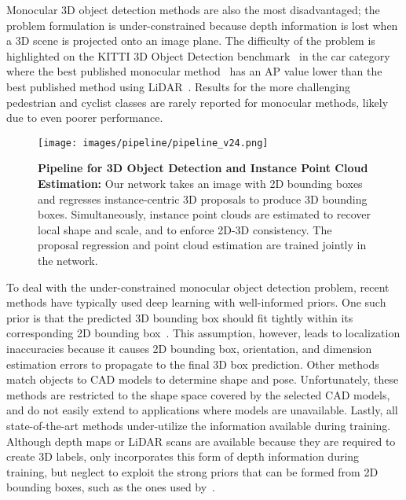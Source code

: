 \documentclass[10pt,twocolumn,letterpaper]{article}
\begin{document}
	Monocular 3D object detection methods are also the most disadvantaged; the problem formulation is under-constrained because depth information is lost when a 3D scene is projected onto an image plane. The difficulty of the problem is highlighted on the KITTI 3D Object Detection benchmark~\cite{geiger_kitti} in the car category where the best published monocular method~\cite{lindernoren} has an AP value  lower than the best published method using LiDAR~\cite{yan2018second}. Results for the more challenging pedestrian and cyclist classes are rarely reported for monocular methods, likely due to even poorer performance.
	
	\begin{figure}[t!]
		\begin{center}
			\texttt{[image: images/pipeline/pipeline\_v24.png]}
		\end{center}
		\caption{\textbf{Pipeline for 3D Object Detection and Instance Point Cloud Estimation:} Our network takes an image with 2D bounding boxes and regresses instance-centric 3D proposals to produce 3D bounding boxes. Simultaneously, instance point clouds are estimated to recover local shape and scale, and to enforce 2D-3D consistency. The proposal regression and point cloud estimation are trained jointly in the network.}
		\label{fig:pipeline}
	\end{figure}
	
	To deal with the under-constrained monocular object detection problem, recent methods have typically used deep learning with well-informed priors. One such prior is that the predicted 3D bounding box should fit tightly within its corresponding 2D bounding box~\cite{mousavian_deep3dbox}. This assumption, however, leads to localization inaccuracies because it causes 2D bounding box, orientation, and dimension estimation errors to propagate to the final 3D box prediction. Other methods~\cite{chabot_deepmanta, kundu_3drcnn} match objects to CAD models to determine shape and pose. Unfortunately, these methods are restricted to the shape space covered by the selected CAD models, and do not easily extend to applications where models are unavailable. Lastly, all state-of-the-art methods under-utilize the information available during training. Although depth maps or LiDAR scans are available because they are required to create 3D labels, only \cite{xu_multifusion} incorporates this form of depth information during training, but neglect to exploit the strong priors that can be formed from 2D bounding boxes, such as the ones used by~\cite{lindernoren, mousavian_deep3dbox}.
	
\end{document}
